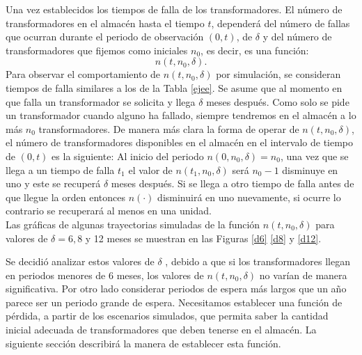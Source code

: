 
\noindent Una vez establecidos los tiempos de falla de los transformadores. El n\'umero de transformadores en el almac\'en hasta el  tiempo $t$, depender\'a del n\'umero de fallas que ocurran durante el periodo de observaci\'on $(0,t)$, de $\delta$ y del n\'umero de transformadores que fijemos como iniciales $n_0$, es decir, es una funci\'on: $$n(t,n_0,\delta).$$
\noindent Para observar el comportamiento de $n(t,n_0,\delta)$ por simulaci\'on, se consideran tiempos de falla similares a los de la  Tabla \ref{ejee}. Se asume que al momento en que falla un transformador se solicita y llega $\delta$ meses despu\'es. Como solo se pide un transformador cuando alguno ha fallado, siempre tendremos en el almac\'en a lo m\'as $n_0$ transformadores.
\noindent De manera m\'as clara la forma de operar de $n(t,n_0,\delta)$, el n\'umero de transformadores disponibles en el almac\'en en el intervalo de tiempo de  $(0,t)$ es la siguiente: Al inicio del periodo $n(0,n_0,\delta)=n_0$, una vez que se llega a un tiempo de falla $t_1$ el valor de $n(t_1,n_0,\delta)$ ser\'a $n_0-1$ disminuye en uno y este se recuper\'a $\delta$ meses despu\'es. Si se llega a otro tiempo de falla antes de que llegue la orden entonces $n(\cdot)$ disminuir\'a en uno nuevamente, si ocurre lo contrario se recuperar\'a al menos en una unidad.\\[0.1cm]

\noindent Las gr\'aficas de algunas trayectorias simuladas de la funci\'on $n(t,n_0,\delta)$ para valores de $\delta=6,8$ y 12 meses  se muestran en las Figuras \ref{d6} \ref{d8} y \ref{d12}.

 \noindent Se decidi\'o analizar estos valores de $\delta$ , debido a que si los transformadores llegan en periodos menores de 6 meses, los valores de $n(t,n_0,\delta)$ no var\'ian de manera significativa. Por otro lado considerar periodos de espera m\'as largos que un a\~no parece ser un periodo grande de espera. 
\noindent Necesitamos establecer una funci\'on de p\'erdida, a partir de los escenarios simulados,  que permita saber la cantidad inicial adecuada de transformadores que deben tenerse en el almac\'en. La siguiente secci\'on describir\'a la manera de establecer esta funci\'on.


